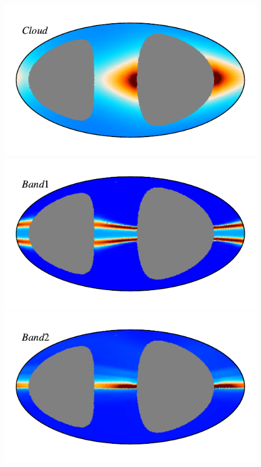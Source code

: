 \documentclass{aa}
\begin{document}
  \begin{figure}
    \centering
    \includegraphics[width=0.9\columnwidth]{figs/zodi_comps/zodi_06_a_cloud.pdf}
    \vspace{-0.6cm}

    \includegraphics[width=0.9\columnwidth]{figs/zodi_comps/zodi_06_a_band1.pdf}
    \vspace{-0.6cm}

    \includegraphics[width=0.9\columnwidth]{figs/zodi_comps/zodi_06_a_band2.pdf}
    \vspace{-0.6cm}


\end{figure}
\end{document}
